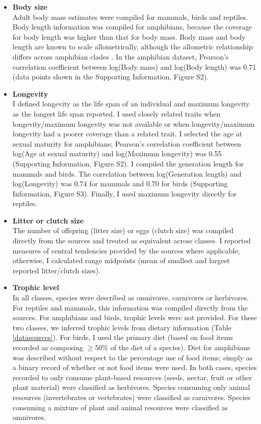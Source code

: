 \newpage
\begin{itemize}
\item \textbf{Body size}\\
Adult body mass estimates were compiled for mammals, birds and reptiles. Body length information was compiled for amphibians, because the coverage for body length was higher than that for body mass. Body mass and body length are known to scale allometrically, although the allometric relationship differs across amphibian clades \citep{Santini2018}. In the amphibian dataset, Pearson’s correlation coefficient between log(Body mass) and log(Body length) was 0.71 (data points shown in the Supporting Information, Figure S2).
 
\item \textbf{Longevity}\\
I defined longevity as the life span of an individual and maximum longevity as the longest life span reported. I used closely related traits when longevity/maximum longevity was not available or when longevity/maximum longevity had a poorer coverage than a related trait. I selected the age at sexual maturity for amphibians; Pearson’s correlation coefficient between log(Age at sexual maturity) and log(Maximum longevity) was 0.55 (Supporting Information, Figure S2). I compiled the generation length for mammals and birds. The correlation between log(Generation length) and log(Longevity) was 0.74 for mammals and 0.70 for birds (Supporting Information, Figure S3). Finally, I used maximum longevity directly for reptiles.

\item \textbf{Litter or clutch size}\\
The number of offspring (litter size) or eggs (clutch size) was compiled directly from the sources and treated as equivalent across classes. I reported measures of central tendencies provided by the sources where applicable; otherwise, I calculated range midpoints (mean of smallest and largest reported litter/clutch sizes).

\item \textbf{Trophic level}\\
In all classes, species were described as omnivores, carnivores or herbivores. For reptiles and mammals, this information was compiled directly from the sources. For amphibians and birds, trophic levels were not provided. For these two classes, we inferred trophic levels from dietary information (Table \ref{datasources}). For birds, I used the primary diet (based on food items recorded as composing $\geq$50\% of the diet of a species). Diet for amphibians was described without respect to the percentage use of food items; simply as a binary record of whether or not food items were used. In both cases, species recorded to only consume plant-based resources (seeds, nectar, fruit or other plant material) were classified as herbivores. Species consuming only animal resources (invertebrates or vertebrates) were classified as carnivores. Species consuming a mixture of plant and animal resources were classified as omnivores.


\end{itemize}
